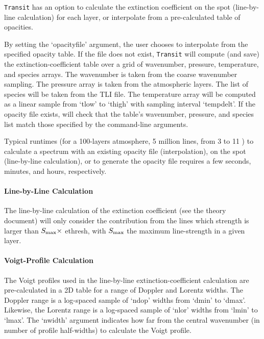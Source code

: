 \documentclass[letterpaper, 12pt]{article}
\begin{document}
{\tt Transit} has an option to calculate the extinction coefficient on
the spot (line-by-line calculation) for each layer, or interpolate
from a pre-calculated table of opacities.

By setting the `{\tttb opacityfile}' argument, the user chooses to
interpolate from the specified opacity table.  If the file does not
exist, {\tt Transit} will compute (and save) the
extinction-coefficient table over a grid of wavenumber, pressure,
temperature, and species arrays.  The wavenumber is taken from the
coarse wavenumber sampling.  The pressure array is taken from the
atmospheric layers.  The list of species will be taken from the TLI
file.  The temperature array will be computed as a linear sample from
{\tttb `tlow'} to {\tttb `thigh'} with sampling interval {\tttb
  `tempdelt'}.  If the opacity file exists, {\transit} will check that
the table's wavenumber, pressure, and species list match those
specified by the command-line arguments.


Typical runtimes (for a 100-layers atmosphere, 5 million lines, from 3
to 11 {\microns}) to calculate a spectrum with an existing opacity
file (interpolation), on the spot (line-by-line calculation), or to
generate the opacity file requires a few seconds, minutes, and hours,
respectively.

\paragraph{Line-by-Line Calculation}

The line-by-line calculation of the extinction coefficient (see the
theory document) will only consider the contribution from the lines
which strength is larger than $S\sb{\rm max} \times$ {\tttb ethresh},
with $S\sb{\rm max}$ the maximum line-strength in a given layer.

\paragraph{Voigt-Profile Calculation}

The Voigt profiles used in the line-by-line extinction-coefficient
calculation are pre-calculated in a 2D table for a range of
Doppler and Lorentz widths.  The Doppler range is a log-spaced sample
of `{\tttb ndop}' widths from `{\tttb dmin}' to `{\tttb dmax}'.
Likewise, the Lorentz range is a log-spaced sample
of `{\tttb nlor}' widths from `{\tttb lmin}' to `{\tttb lmax}'.
The `{\tttm nwidth}' argument indicates how far from the central
wavenumber (in number of profile half-widths) to calculate the Voigt
profile.
\end{document}
